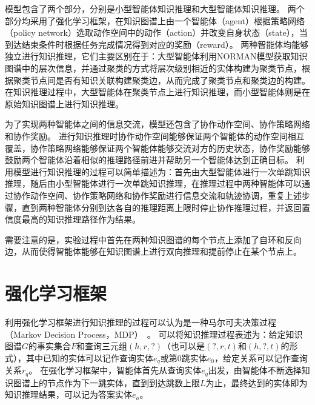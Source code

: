 \documentclass[algorithmlist, AutoFakeBold, AutoFakeSlant, figurelist, tablelist, nomlist, engineering, openany]{seuthesix} %
\begin{document}
模型包含了两个部分，分别是小型智能体知识推理和大型智能体知识推理。
两个部分均采用了强化学习框架，在知识图谱上由一个智能体（agent）根据策略网络（policy network）选取动作空间中的动作（action）并改变自身状态（state），当到达结束条件时根据任务完成情况得到对应的奖励（reward）。
两种智能体均能够独立进行知识推理，它们主要区别在于：大型智能体利用NORMAN模型获取知识图谱中的层次信息，并通过聚类的方式将层次级别相近的实体构建为聚类节点，根据聚类节点间是否有知识关联构建聚类边，从而完成了聚类节点和聚类边的构建。在知识推理过程中，大型智能体在聚类节点上进行知识推理，而小型智能体则是在原始知识图谱上进行知识推理。

为了实现两种智能体之间的信息交流，模型还包含了协作动作空间、协作策略网络和协作奖励。
进行知识推理时协作动作空间能够保证两个智能体的动作空间相互覆盖，协作策略网络能够保证两个智能体能够交流对方的历史状态，协作奖励能够鼓励两个智能体沿着相似的推理路径前进并帮助另一个智能体达到正确目标。
利用模型进行知识推理的过程可以简单描述为：首先由大型智能体进行一次单跳知识推理，随后由小型智能体进行一次单跳知识推理，在推理过程中两种智能体可以通过协作动作空间、协作策略网络和协作奖励进行信息交流和轨迹协调，重复上述步骤，直到两种智能体分别到达各自的推理距离上限时停止协作推理过程，并返回置信度最高的知识推理路径作为结果。

需要注意的是，实验过程中首先在两种知识图谱的每个节点上添加了自环和反向边，从而使得智能体能够在知识图谱上进行双向推理和提前停止在某个节点上。



\section{强化学习框架}
利用强化学习框架进行知识推理的过程可以认为是一种马尔可夫决策过程（Markov Decision Process，MDP）~\cite{gronauer2022multi}。
可以将知识推理过程表述为：给定知识图谱$G$的事实集合$F$和查询三元组$(h, r, ?)$（也可以是$(?, r, t)$和$(h, ?, t)$的形式），其中已知的实体可以记作查询实体$e_q$或第0跳实体$e_0$，给定关系可以记作查询关系$r_q$。
在强化学习框架中，智能体首先从查询实体$e_q$出发，由智能体不断选择知识图谱上的节点作为下一跳实体，直到到达跳数上限$L$为止，最终达到的实体即为知识推理结果，可以记为答案实体$e_a$。
\end{document}
